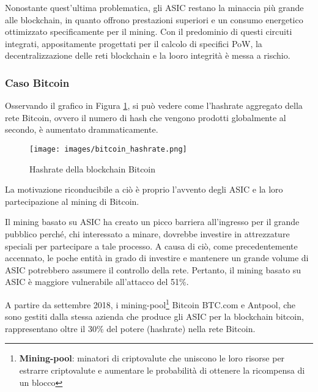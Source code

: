 Nonostante quest'ultima problematica, gli ASIC restano la minaccia più grande alle blockchain, in quanto offrono prestazioni superiori e un consumo energetico ottimizzato specificamente per il mining. 
Con il predominio di questi circuiti integrati, appositamente progettati per il calcolo di specifici PoW, la decentralizzazione delle reti blockchain e la looro integrità è messa a rischio. 



\subsubsection{Caso Bitcoin}
Osservando il grafico in Figura \ref{fig:btc-hashrate}, si può vedere come l'hashrate aggregato della rete Bitcoin, ovvero il numero di hash che vengono prodotti globalmente al secondo, è aumentato drammaticamente.

\begin{figure}[h!]
    \centering
    \texttt{[image: images/bitcoin\_hashrate.png]}
    \caption{Hashrate della blockchain Bitcoin \cite{asic1}}
    \label{fig:btc-hashrate}
\end{figure}

La motivazione riconducibile a ciò è proprio l'avvento degli ASIC e la loro partecipazione al mining di Bitcoin.

Il mining basato su ASIC ha creato un picco barriera all'ingresso per il grande pubblico perché, chi interessato a minare, dovrebbe investire in attrezzature speciali per partecipare a tale processo.
A causa di ciò, come precedentemente accennato, le poche entità in grado di investire e mantenere un grande volume di ASIC potrebbero assumere il controllo della rete.
Pertanto, il mining basato su ASIC è maggiore vulnerabile all'attacco del 51\%. 


A partire da settembre 2018, i mining-pool\footnote{\textbf{Mining-pool}: minatori di criptovalute che uniscono le loro risorse per estrarre criptovalute e aumentare le probabilità di ottenere la ricompensa di un blocco} Bitcoin BTC.com e Antpool, che sono gestiti dalla stessa azienda che produce gli ASIC per la blockchain bitcoin, rappresentano oltre il 30\% del potere (hashrate) nella rete Bitcoin. 
